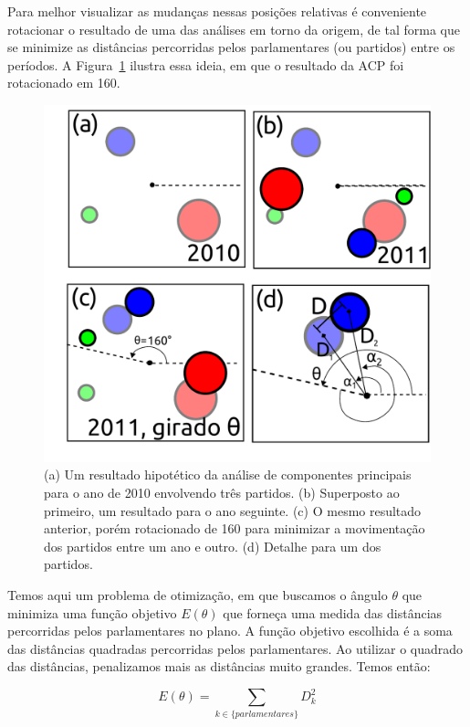\documentclass[
	article,			%
	12pt,				%
    twoside,			%
	a4paper,			%
	english,			%
	french,				%
	spanish,			%
	brazil,				%
	]{abntex2}
\begin{document}
Para melhor visualizar as mudanças nessas posições relativas é conveniente rotacionar o resultado de uma das análises em torno da origem, de tal forma que se minimize as distâncias percorridas pelos parlamentares (ou partidos) entre os períodos. A Figura~\ref{fig:rotacoes} ilustra essa ideia, em que o resultado da
ACP foi rotacionado em 160\degree. \\

\begin{figure}[h]
  \centering
  \includegraphics[scale=0.5]{figs/rotacoes.pdf}
  \caption{(a) Um resultado hipotético da análise de componentes principais para o ano de 2010 envolvendo três partidos. (b) Superposto ao primeiro, um resultado para o ano seguinte. (c) O mesmo resultado anterior, porém rotacionado de 160\textdegree{} para minimizar a movimentação dos partidos entre um ano e outro. (d) Detalhe para um dos partidos.}
  \label{fig:rotacoes}
\end{figure}

Temos aqui um problema de otimização, em que buscamos o ângulo $\theta$ que minimiza uma função objetivo $E(\theta)$ que forneça uma medida das distâncias percorridas pelos parlamentares no plano. A função objetivo escolhida é a soma das distâncias quadradas percorridas pelos parlamentares. Ao utilizar o quadrado das distâncias, penalizamos mais as distâncias muito grandes. Temos então:

\begin{equation}
E(\theta)=\sum_{k\in\{parlamentares\}} D_{k}^{2}
\label{eq:e_theta}
\end{equation}
\end{document}
